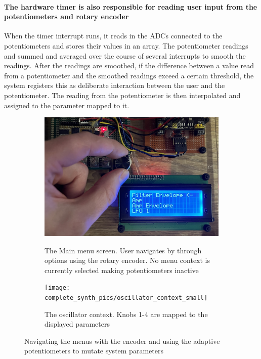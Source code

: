 \documentclass[acmlarge,screen]{acmart}
\begin{document}
	\paragraph{The hardware timer is also responsible for reading user input from the potentiometers and rotary encoder} When the timer interrupt runs, it reads in the ADCs connected to the potentiometers and stores their values in an array. The potentiometer readings and summed and averaged over the course of several interrupts to smooth the readings. After the readings are smoothed, if the difference between a value read from a potentiometer and the smoothed readings exceed a certain threshold, the system registers this as deliberate interaction between the user and the potentiometer. The reading from the potentiometer is then interpolated and assigned to the parameter mapped to it.

	\begin{figure}[H]
		\centering
		\begin{subfigure}{.5\textwidth}
			\centering
			\caption{The Main menu screen. User navigates by through options using the rotary encoder. No menu context is currently selected making potentiometers inactive}
			\includegraphics[width=.9\linewidth]{complete_synth_pics/menu_navigation}
			\label{fig:sub1}
		\end{subfigure}%
		\begin{subfigure}{.5\textwidth}
			\centering
			\caption{The oscillator context. Knobs 1-4 are mapped to the displayed parameters}
			\texttt{[image: complete\_synth\_pics/oscillator\_context\_small]}
			\label{fig:sub2}
		\end{subfigure}
		\caption{Navigating the menus with the encoder and using the adaptive potentiometers to mutate system parameters}
		\label{fig:test}
	\end{figure}	
\end{document}

